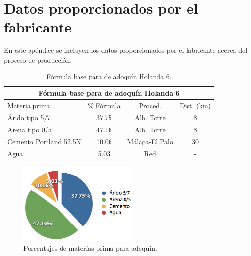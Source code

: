 \chapter{Datos proporcionados por el fabricante}\label{apend:datos}
En este apéndice se incluyen los datos proporcionados por el fabricante acerca del proceso de producción.

\begin{table}[!htb]
\centering
\begin{tabular}{lccc}
\toprule
\multicolumn{4}{c}{Fórmula base para de adoquín Holanda 6}\\
\midrule
Materia prima & \% Fórmula & Proced. & Dist. (\si{km})\\
\midrule
Árido tipo 5/7 & 37.75 & Alh. Torre & 8\\
Arena tipo 0/5 & 47.16 & Alh. Torre & 8\\
Cemento Portland 52.5N & 10.06 & Málaga-El Palo & 30\\
Agua & 5.03 & Red & -\\
\bottomrule
\end{tabular}
\caption{Fórmula base para de adoquín Holanda 6.}
\label{formulabase}
\end{table}

\begin{figure}[!htb]
\centering
\includegraphics[width=6cm]{img/porcent_matprima.png}
\caption{Porcentajes de materías prima para adoquín.}
\label{fig:porcentmatprima}
\end{figure}

